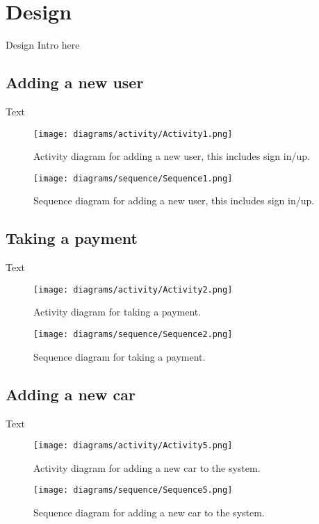 \section{Design}
  Design Intro here

  \subsection{Adding a new user}
    Text

    \begin{figure}[H]
      \centering
      \texttt{[image: diagrams/activity/Activity1.png]}
      \caption{Activity diagram for adding a new user, this includes sign in/up.}
      \label{fig:newUserActivity}
    \end{figure}

    \begin{figure}[H]
      \centering
      \texttt{[image: diagrams/sequence/Sequence1.png]}
      \caption{Sequence diagram for adding a new user, this includes sign in/up.}
      \label{fig:newUserSequence}
    \end{figure}
  
  \newpage
  
  \subsection{Taking a payment}
    Text

    \begin{figure}[H]
      \centering
      \texttt{[image: diagrams/activity/Activity2.png]}
      \caption{Activity diagram for taking a payment.}
      \label{fig:takePaymentActivity}
    \end{figure}

    \begin{figure}[H]
      \centering
      \texttt{[image: diagrams/sequence/Sequence2.png]}
      \caption{Sequence diagram for taking a payment.}
      \label{fig:takePaymentSequence}
    \end{figure}

  \newpage

  \subsection{Adding a new car}
    Text

    \begin{figure}[H]
      \centering
      \texttt{[image: diagrams/activity/Activity5.png]}
      \caption{Activity diagram for adding a new car to the system.}
      \label{fig:newCarActivity}
    \end{figure}

    \begin{figure}[H]
      \centering
      \texttt{[image: diagrams/sequence/Sequence5.png]}
      \caption{Sequence diagram for adding a new car to the system.}
      \label{fig:newCarSequence}
    \end{figure}
\newpage